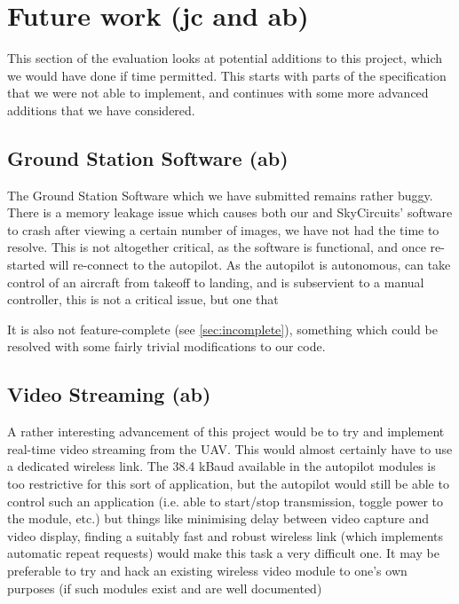 \section{Future work (jc and ab)}

This section of the evaluation looks at potential additions to this project, 
which we would have done if time permitted. This starts with parts of the 
specification that we were not able to implement, and continues with some 
more advanced additions that we have considered.

\subsection{Ground Station Software (ab)}

The Ground Station Software which we have submitted remains rather buggy. 
There is a memory leakage issue which causes both our and SkyCircuits' 
software to crash after viewing a certain number of images, we have not had the time to resolve. This is not altogether critical, as the software 
is functional, and once re-started will re-connect to the autopilot. 
As the autopilot is autonomous, can take control of an aircraft from takeoff 
to landing, and is subservient to a manual controller, this is not a critical 
issue, but one that 

It is also not feature-complete (see \ref{sec:incomplete}), something which 
could be resolved with some fairly trivial modifications to our code.



\subsection{Video Streaming (ab)}

A rather interesting advancement of this project would be to try and implement 
real-time video streaming from the UAV. This would almost certainly have to use 
a dedicated wireless link. The 38.4 kBaud available in the autopilot modules 
is too restrictive for this sort of application, but the autopilot would still 
be able to control such an application (i.e. able to start/stop transmission, 
toggle power to the module, etc.) but things like 
minimising delay between video capture and video 
display, finding a suitably fast and robust wireless link (which implements 
automatic repeat requests) would make this task a very difficult one. It may 
be preferable to try and hack an existing wireless video module to one's own purposes (if such modules exist and are 
well documented)

